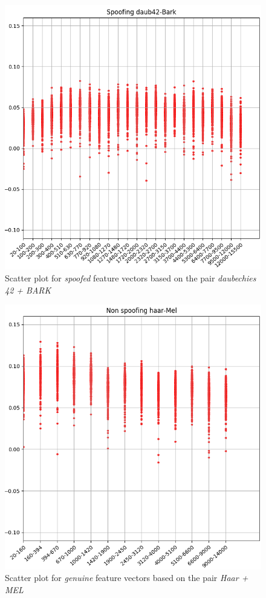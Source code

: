 \begin{figure}[H]
\centering
\includegraphics[scale=.55]{images/results/barkVersusMel/spoofingDaub42Bark}
\caption{Scatter plot for \textit{spoofed} feature vectors based on the pair \textit{daubechies 42 + BARK}}
\label{fig:spoofingdaub42bark}
\end{figure}
\begin{figure}[H]
\centering
\includegraphics[scale=.55]{images/results/barkVersusMel/liveHaarMel}
\caption{Scatter plot for \textit{genuine} feature vectors based on the pair \textit{Haar + MEL}}
\label{fig:livehaarmel}
\end{figure}
